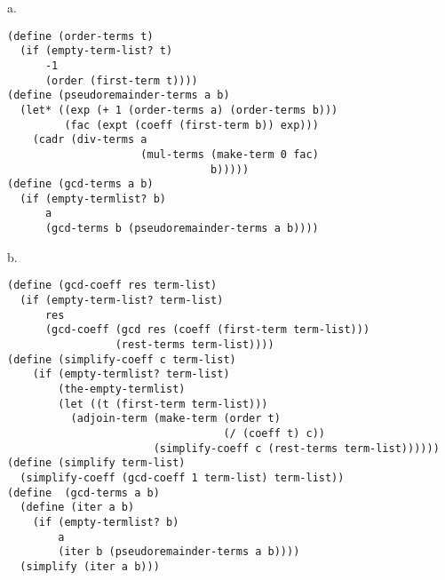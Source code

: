 \documentclass[a4paper,12pt]{article}
\newcommand{\subpar}[1] {\medskip \noindent #1.}
\begin{document}
\subpar{a}
\begin{lstlisting}
(define (order-terms t)
  (if (empty-term-list? t)
      -1
      (order (first-term t))))
(define (pseudoremainder-terms a b)
  (let* ((exp (+ 1 (order-terms a) (order-terms b)))
         (fac (expt (coeff (first-term b)) exp)))
    (cadr (div-terms a
                     (mul-terms (make-term 0 fac)
                                b)))))
(define (gcd-terms a b)
  (if (empty-termlist? b)
      a
      (gcd-terms b (pseudoremainder-terms a b))))
\end{lstlisting}
\subpar{b}
\begin{lstlisting}
(define (gcd-coeff res term-list)
  (if (empty-term-list? term-list)
      res
      (gcd-coeff (gcd res (coeff (first-term term-list)))
                 (rest-terms term-list))))
(define (simplify-coeff c term-list)
    (if (empty-termlist? term-list)
        (the-empty-termlist)
        (let ((t (first-term term-list)))
          (adjoin-term (make-term (order t)
                                  (/ (coeff t) c))
                       (simplify-coeff c (rest-terms term-list))))))
(define (simplify term-list)
  (simplify-coeff (gcd-coeff 1 term-list) term-list))
(define  (gcd-terms a b)  
  (define (iter a b)
    (if (empty-termlist? b)
        a
        (iter b (pseudoremainder-terms a b))))
  (simplify (iter a b)))
\end{lstlisting}
\end{document}

